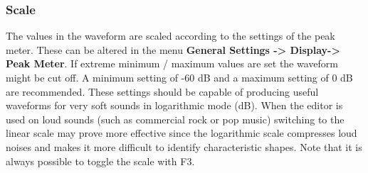 \subsubsection{Scale}
The values in the waveform are scaled according to the settings of the
peak meter. These can be altered in the menu
\textbf{General Settings {}-{\textgreater} Display{}-{\textgreater} Peak Meter}. If extreme minimum /
maximum values are set the waveform might be cut off.  A minimum
setting of {}-60 dB and a maximum setting of 0 dB are recommended.
These settings should be capable of producing useful waveforms for very
soft sounds in logarithmic mode (dB). When the editor is used on loud
sounds (such as commercial rock or pop music) switching to the linear
scale may prove more effective since the logarithmic scale compresses
loud noises and makes it more difficult to identify characteristic
shapes. Note that it is always possible to toggle the scale with F3. 


